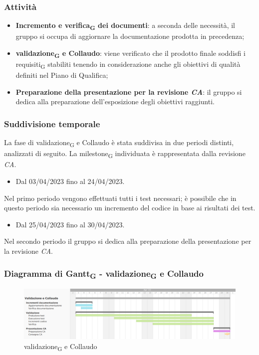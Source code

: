 \subsubsection{Attività}\:
\begin{itemize}
    \item \textbf{Incremento e verifica\textsubscript{G} dei documenti}: a seconda delle necessità, il gruppo si occupa di aggiornare la documentazione prodotta in precedenza;
    \item \textbf{validazione\textsubscript{G} e Collaudo}: viene verificato che il prodotto finale soddisfi i requisiti\textsubscript{G} stabiliti tenendo in considerazione anche gli obiettivi di qualità definiti nel Piano di Qualifica;
    \item \textbf{Preparazione della presentazione per la revisione \textit{CA}}: il gruppo si dedica alla preparazione dell’esposizione degli obiettivi raggiunti.
\end{itemize}



\subsubsection{Suddivisione temporale}
La fase di validazione\textsubscript{G} e Collaudo è stata suddivisa in due periodi distinti, analizzati di seguito. La milestone\textsubscript{G} individuata è rappresentata dalla revisione \textit{CA}.

\:
\begin{itemize}
    \item Dal 03/04/2023 fino al 24/04/2023.
\end{itemize}
Nel primo periodo vengono effettuati tutti i test necessari; è possibile che in questo periodo sia necessario un incremento del codice in base ai risultati dei test.

\:
\begin{itemize}
    \item Dal 25/04/2023 fino al 30/04/2023.
\end{itemize}
Nel secondo periodo il gruppo si dedica alla preparazione della presentazione per la revisione \textit{CA}.

\subsubsection{Diagramma di Gantt\textsubscript{G} - validazione\textsubscript{G} e Collaudo}

\begin{figure}[H]
\centering
\includegraphics[width=\textwidth]{img/4_collaudo.png}
\caption{validazione\textsubscript{G} e Collaudo}
\end{figure}

